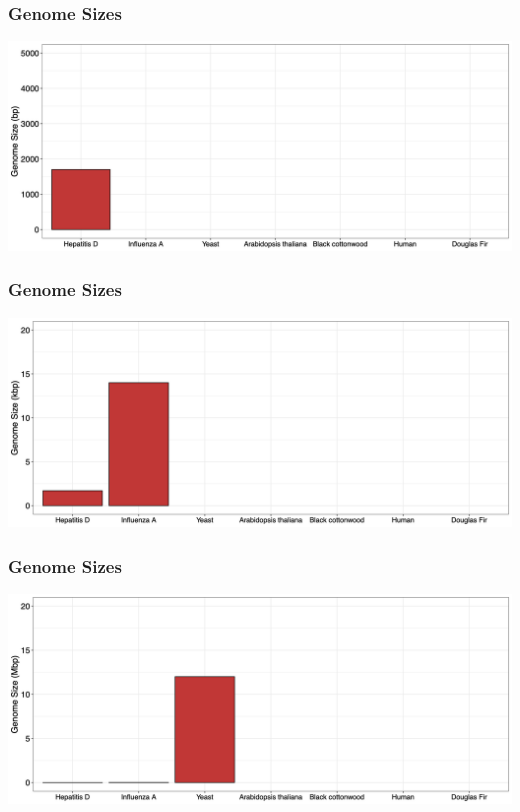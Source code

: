 \documentclass{beamer}
\begin{document}
\begin{frame}
	\frametitle{Genome Sizes}
	\centering	\includegraphics[keepaspectratio, width  =1\textwidth]{img/hepD.png}\\
\end{frame}

\begin{frame}
	\frametitle{Genome Sizes}
	\centering	\includegraphics[keepaspectratio, width  =1\textwidth]{img/flu.png}\\
\end{frame}

\begin{frame}
	\frametitle{Genome Sizes}
	\centering	\includegraphics[keepaspectratio, width  =1\textwidth]{img/yeast.png}\\
\end{frame}
\end{document}
